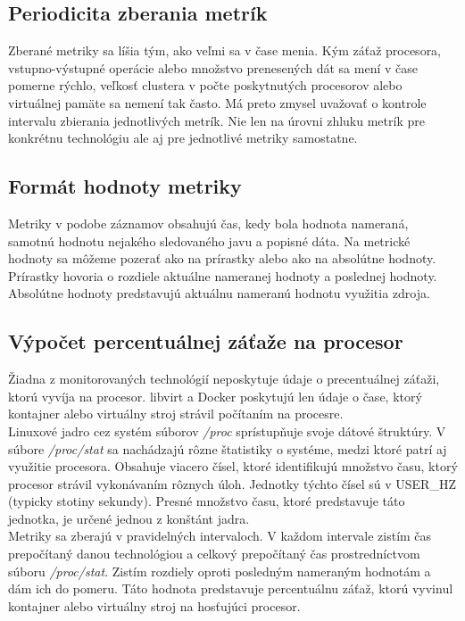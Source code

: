 \documentclass[printed,11pt,twoside,color,cover,table]{fithesis3}
\begin{document}
\subsection{Periodicita zberania metrík}
Zberané metriky sa líšia tým, ako veľmi sa v čase menia. Kým záťaž procesora, vstupno-výstupné operácie alebo množstvo prenesených dát sa mení v čase pomerne rýchlo, veľkosť clustera v počte poskytnutých procesorov 
alebo virtuálnej pamäte sa nemení tak často. Má preto zmysel uvažovať o kontrole intervalu zbierania jednotlivých metrík. Nie len na úrovni zhluku metrík pre konkrétnu technológiu ale aj pre jednotlivé metriky samostatne.

\subsection{Formát hodnoty metriky}
Metriky v podobe záznamov obsahujú čas, kedy bola hodnota nameraná, samotnú hodnotu nejakého sledovaného javu a popisné dáta. Na metrické
hodnoty sa môžeme pozerať ako na prírastky alebo ako na absolútne hodnoty. Prírastky hovoria o rozdiele aktuálne nameranej hodnoty 
a poslednej hodnoty. Absolútne hodnoty predstavujú aktuálnu nameranú hodnotu využitia zdroja. 

\subsection{Výpočet percentuálnej záťaže na procesor}
Žiadna z monitorovaných technológií neposkytuje údaje o precentuálnej záťaži, ktorú vyvíja na procesor. libvirt a Docker poskytujú len údaje o čase, ktorý kontajner alebo virtuálny stroj strávil
počítaním na procesre. 
\\Linuxové jadro cez systém súborov \textit{/proc} sprístupňuje svoje dátové štruktúry. V súbore \textit{/proc/stat} sa nachádzajú rôzne štatistiky o systéme, medzi ktoré patrí aj 
využitie procesora. Obsahuje viacero čísel, ktoré identifikujú množstvo času, ktorý procesor strávil vykonávaním rôznych úloh. Jednotky týchto čísel sú v USER\_HZ (typicky stotiny sekundy).\cite{proc-stat}
Presné množstvo času, ktoré predstavuje táto jednotka, je určené jednou z konštánt jadra.
\\Metriky sa zberajú v pravidelných intervaloch. V každom intervale zistím čas prepočítaný danou technológiou a celkový prepočítaný čas prostredníctvom súboru \textit{/proc/stat}. Zistím rozdiely oproti posledným nameraným hodnotám a dám ich do pomeru.
Táto hodnota predstavuje percentuálnu záťaž, ktorú vyvinul kontajner alebo virtuálny stroj na hosťujúci procesor.
\end{document}
